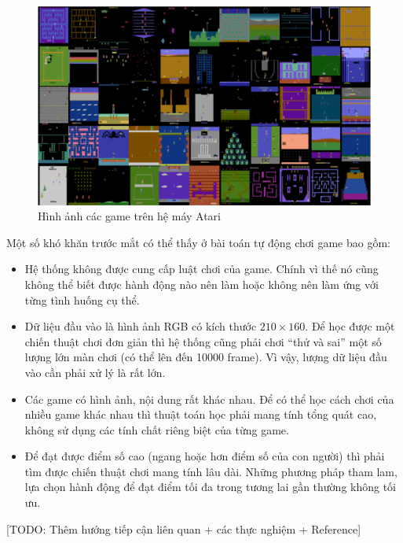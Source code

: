 \begin{figure}
	\centering
	\includegraphics[width=\textwidth]{ale_55_games}
	\caption{Hình ảnh các game trên hệ máy Atari}
	\label{Ale55Games}
\end{figure}

Một số khó khăn trước mắt có thể thấy ở bài toán tự động chơi game bao gồm:
\begin{itemize}
	\item Hệ thống không được cung cấp luật chơi của game. Chính vì thế nó cũng không thể biết được hành động nào nên làm hoặc không nên làm ứng với từng tình huống cụ thể.
	\item Dữ liệu đầu vào là hình ảnh RGB có kích thước $210\times160$. Để học được một chiến thuật chơi đơn giản thì hệ thống cũng phải chơi ``thử và sai'' một số lượng lớn màn chơi (có thể lên đến 10000 frame). Vì vậy, lượng dữ liệu đầu vào cần phải xử lý là rất lớn.
	\item Các game có hình ảnh, nội dung rất khác nhau. Để có thể học cách chơi của nhiều game khác nhau thì thuật toán học phải mang tính tổng quát cao, không sử dụng các tính chất riêng biệt của từng game.
	\item Để đạt được điểm số cao (ngang hoặc hơn điểm số của con người) thì phải tìm được chiến thuật chơi mang tính lâu dài. Những phương pháp tham lam, lựa chọn hành động để đạt điểm tối đa trong tương lai gần thường không tối ưu.
\end{itemize}

[TODO: Thêm hướng tiếp cận liên quan + các thực nghiệm + Reference]


